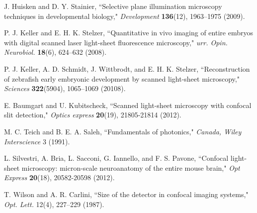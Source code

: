 \documentclass[12pt]{spieman}  %
\begin{document}
\begin{thebibliography}{0}

 J. Huisken and D. Y. Stainier, ``Selective plane illumination microscopy techniques in developmental biology," \emph{Development} \textbf{136}(12), 1963–1975 (2009).

 P. J. Keller and E. H. K. Stelzer, ``Quantitative in vivo imaging of entire embryos with digital scanned laser light-sheet fluorescence microscopy," \emph{urr. Opin. Neurobiol.} \textbf{18}(6), 624–632 (2008).

 P. J. Keller, A. D. Schmidt, J. Wittbrodt, and E. H. K. Stelzer, ``Reconstruction of zebrafish early embryonic development by scanned light-sheet microscopy," \emph{Sciences} \textbf{322}(5904), 1065–1069 (20108).

 E. Baumgart and U. Kubitscheck, ``Scanned light-sheet microscopy with confocal slit detection," \emph{Optics express} \textbf{20}(19), 21805-21814 (2012).

%
%

 M. C. Teich and B. E. A. Saleh, ``Fundamentals of photonics," \emph{Canada, Wiley Interscience} 3 (1991).

 L. Silvestri, A. Bria, L. Sacconi, G. Iannello,  and F. S. Pavone,  ``Confocal light-sheet microscopy: micron-scale neuroanatomy of the entire mouse brain," \emph{Opt Express} \textbf{20}(18), 20582-20598 (2012).

 T. Wilson and A. R. Carlini, ``Size of the detector in confocal imaging systems," \emph{Opt. Lett.} 12(4), 227–229 (1987).


\end{thebibliography}
\end{document}
